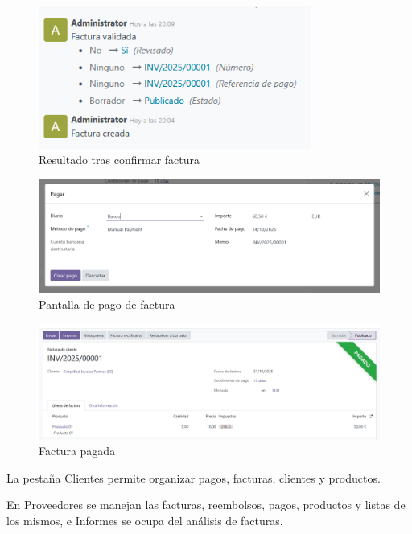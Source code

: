\documentclass[a4paper,12pt]{article}
\begin{document}
\begin{figure}[h!]
    \centering
    \includegraphics[width=0.8\textwidth]{pr2odoo08-facturac06.png}
    \caption{Resultado tras confirmar factura}
\end{figure}
\FloatBarrier

\begin{figure}[h!]
    \centering
    \includegraphics[width=1\textwidth]{pr2odoo09-facturac07.png}
    \caption{Pantalla de pago de factura}
\end{figure}
\FloatBarrier

\begin{figure}[h!]
    \centering
    \includegraphics[width=1\textwidth]{pr2odoo10-facturac08.png}
    \caption{Factura pagada}
\end{figure}
\FloatBarrier

La pestaña Clientes permite organizar pagos, facturas, clientes y productos.

En Proveedores se manejan las facturas, reembolsos, pagos, productos y listas de los mismos, e Informes se ocupa del análisis de facturas.\\
\end{document}
